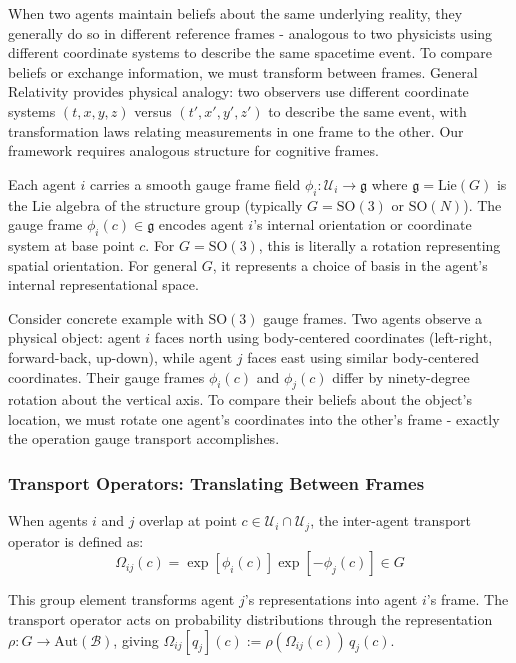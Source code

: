 \documentclass[11pt]{article}
\begin{document}
When two agents maintain beliefs about the same underlying reality, they generally do so in different reference frames - analogous to two physicists using different coordinate systems to describe the same spacetime event. To compare beliefs or exchange information, we must transform between frames. General Relativity provides physical analogy: two observers use different coordinate systems $(t,x,y,z)$ versus $(t',x',y',z')$ to describe the same event, with transformation laws relating measurements in one frame to the other. Our framework requires analogous structure for cognitive frames.

Each agent $i$ carries a smooth gauge frame field $\phi_i: \mathcal{U}_i \to \mathfrak{g}$ where $\mathfrak{g} = \mathrm{Lie}(G)$ is the Lie algebra of the structure group (typically $G = \mathrm{SO}(3)$ or $\mathrm{SO}(N)$). The gauge frame $\phi_i(c) \in \mathfrak{g}$ encodes agent $i$'s internal orientation or coordinate system at base point $c$. For $G = \mathrm{SO}(3)$, this is literally a rotation representing spatial orientation. For general $G$, it represents a choice of basis in the agent's internal representational space.

Consider concrete example with $\mathrm{SO}(3)$ gauge frames. Two agents observe a physical object: agent $i$ faces north using body-centered coordinates (left-right, forward-back, up-down), while agent $j$ faces east using similar body-centered coordinates. Their gauge frames $\phi_i(c)$ and $\phi_j(c)$ differ by ninety-degree rotation about the vertical axis. To compare their beliefs about the object's location, we must rotate one agent's coordinates into the other's frame - exactly the operation gauge transport accomplishes.



\subsubsection{Transport Operators: Translating Between Frames}

When agents $i$ and $j$ overlap at point $c \in \mathcal{U}_i \cap \mathcal{U}_j$, the inter-agent transport operator is defined as:
\begin{equation}
\Omega_{ij}(c) = \exp[\phi_i(c)] \exp[-\phi_j(c)] \in G
\end{equation}

This group element transforms agent $j$'s representations into agent $i$'s frame. The transport operator acts on probability distributions through the representation $\rho: G \to \mathrm{Aut}(\mathcal{B})$, giving $\Omega_{ij}[q_j](c) := \rho(\Omega_{ij}(c)) \, q_j(c)$.
\end{document}
